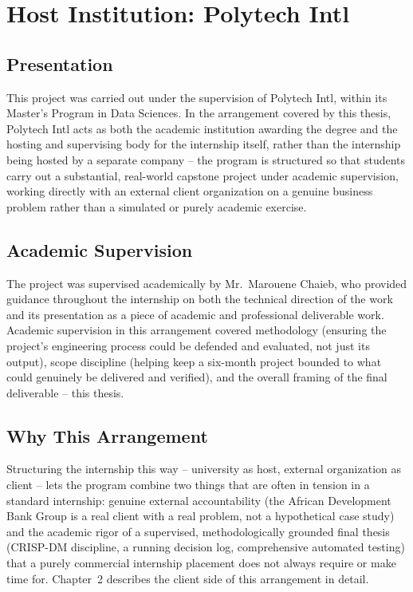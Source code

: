 \chapter{Host Institution: Polytech Intl}
\label{ch:host}

\section{Presentation}

This project was carried out under the supervision of Polytech Intl, within its Master's Program in Data Sciences. In the arrangement covered by this thesis, Polytech Intl acts as both the academic institution awarding the degree and the hosting and supervising body for the internship itself, rather than the internship being hosted by a separate company -- the program is structured so that students carry out a substantial, real-world capstone project under academic supervision, working directly with an external client organization on a genuine business problem rather than a simulated or purely academic exercise.

\section{Academic Supervision}

The project was supervised academically by Mr.~Marouene Chaieb, who provided guidance throughout the internship on both the technical direction of the work and its presentation as a piece of academic and professional deliverable work. Academic supervision in this arrangement covered methodology (ensuring the project's engineering process could be defended and evaluated, not just its output), scope discipline (helping keep a six-month project bounded to what could genuinely be delivered and verified), and the overall framing of the final deliverable -- this thesis.

\section{Why This Arrangement}

Structuring the internship this way -- university as host, external organization as client -- lets the program combine two things that are often in tension in a standard internship: genuine external accountability (the African Development Bank Group is a real client with a real problem, not a hypothetical case study) and the academic rigor of a supervised, methodologically grounded final thesis (CRISP-DM discipline, a running decision log, comprehensive automated testing) that a purely commercial internship placement does not always require or make time for. Chapter~2 describes the client side of this arrangement in detail.
